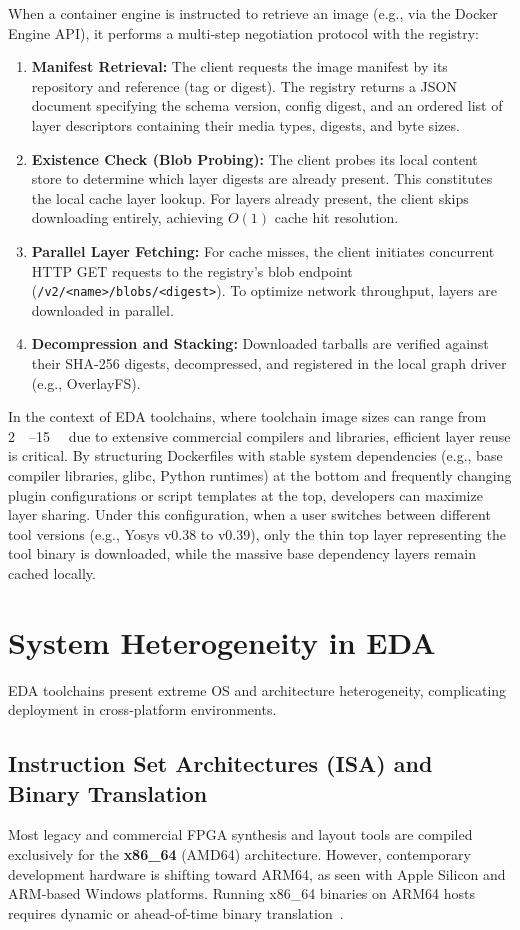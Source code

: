 When a container engine is instructed to retrieve an image (e.g., via the Docker Engine API), it performs a multi-step negotiation protocol with the registry:
\begin{enumerate}
    \item \textbf{Manifest Retrieval:} The client requests the image manifest by its repository and reference (tag or digest). The registry returns a JSON document specifying the schema version, config digest, and an ordered list of layer descriptors containing their media types, digests, and byte sizes.
    \item \textbf{Existence Check (Blob Probing):} The client probes its local content store to determine which layer digests are already present. This constitutes the local cache layer lookup. For layers already present, the client skips downloading entirely, achieving $O(1)$ cache hit resolution.
    \item \textbf{Parallel Layer Fetching:} For cache misses, the client initiates concurrent HTTP GET requests to the registry's blob endpoint (\texttt{/v2/<name>/blobs/<digest>}). To optimize network throughput, layers are downloaded in parallel.
    \item \textbf{Decompression and Stacking:} Downloaded tarballs are verified against their SHA-256 digests, decompressed, and registered in the local graph driver (e.g., OverlayFS).
\end{enumerate}

In the context of EDA toolchains, where toolchain image sizes can range from \SIrange{2}{15}{\giga\byte} due to extensive commercial compilers and libraries, efficient layer reuse is critical. By structuring Dockerfiles with stable system dependencies (e.g., base compiler libraries, glibc, Python runtimes) at the bottom and frequently changing plugin configurations or script templates at the top, developers can maximize layer sharing. Under this configuration, when a user switches between different tool versions (e.g., Yosys v0.38 to v0.39), only the thin top layer representing the tool binary is downloaded, while the massive base dependency layers remain cached locally.

\section{System Heterogeneity in EDA}
EDA toolchains present extreme OS and architecture heterogeneity, complicating deployment in cross-platform environments.

\subsection{Instruction Set Architectures (ISA) and Binary Translation}
Most legacy and commercial FPGA synthesis and layout tools are compiled exclusively for the \textbf{x86\_64} (AMD64) architecture. However, contemporary development hardware is shifting toward ARM64, as seen with Apple Silicon and ARM-based Windows platforms. Running x86\_64 binaries on ARM64 hosts requires dynamic or ahead-of-time binary translation~\cite{altinay2020survey}.

